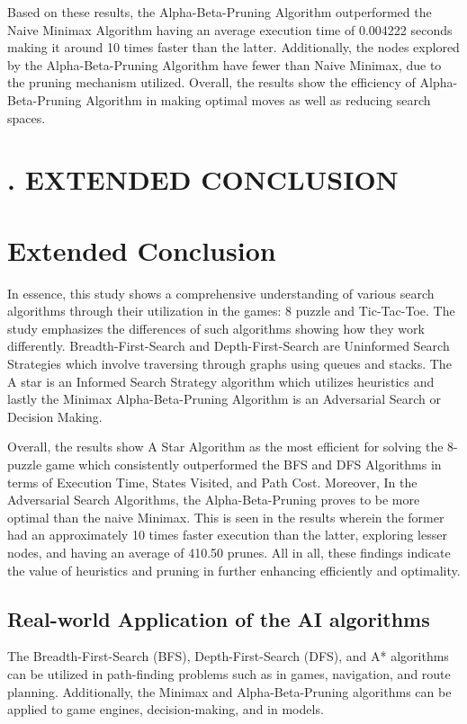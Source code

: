 \documentclass[journal]{./IEEE/IEEEtran}
\begin{document}
Based on these results, the Alpha-Beta-Pruning Algorithm outperformed the Naive Minimax 
Algorithm having an average execution time of 0.004222 seconds making it around 10 times faster 
than the latter. Additionally, the nodes explored by the Alpha-Beta-Pruning Algorithm have fewer 
than Naive Minimax, due to the pruning mechanism utilized. Overall, the results show the efficiency 
of Alpha-Beta-Pruning Algorithm in making optimal moves as well as reducing search spaces.


\setcounter{section}{3}
\renewcommand{\thesection}{}

\section*{\normalsize \thesection. EXTENDED CONCLUSION}
\addcontentsline{toc}{section}{\thesection. Extended Conclusion}

\section{Extended Conclusion}
In essence, this study shows a comprehensive understanding of various search algorithms 
through their utilization in the games: 8 puzzle and Tic-Tac-Toe. The study emphasizes the 
differences of such algorithms showing how they work differently. Breadth-First-Search and 
Depth-First-Search are Uninformed Search Strategies which involve traversing through graphs 
using queues and stacks. The A star is an Informed Search Strategy algorithm which utilizes 
heuristics and lastly the Minimax Alpha-Beta-Pruning Algorithm is an Adversarial Search or Decision Making. 

Overall, the results show A Star Algorithm as the most efficient for solving the 8-puzzle 
game which consistently outperformed the BFS and DFS Algorithms in terms of Execution Time, 
States Visited, and Path Cost. Moreover, In the Adversarial Search Algorithms, the Alpha-Beta-Pruning 
proves to be more optimal than the naive Minimax. This is seen in the results wherein the former had an 
approximately 10 times faster execution than the latter, exploring lesser nodes, and having an average of 
410.50 prunes. All in all, these findings indicate the value of heuristics and pruning in further enhancing 
efficiently and optimality.

\subsection{Real-world Application of the AI algorithms}
The Breadth-First-Search (BFS), Depth-First-Search (DFS), and A* algorithms can be utilized in
path-finding problems such as in games, navigation, and route planning. Additionally, the
Minimax and Alpha-Beta-Pruning algorithms can be applied to game engines, decision-making, and in models.
\end{document}
